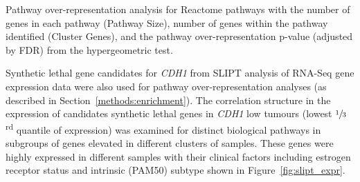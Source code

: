 \begin{table}[!hp]
{\begin{threeparttable}
\begin{tabular}{lccc}
  \hline
\end{tabular}
\begin{tablenotes}
\raggedright %
Pathway over-representation analysis for Reactome pathways with the number of genes in each pathway (Pathway Size), number of genes within the pathway identified (Cluster Genes), and the pathway over-representation p-value (adjusted by FDR) from the hypergeometric test.  
\end{tablenotes}
\end{threeparttable}
}
\end{table}

Synthetic lethal gene candidates for \textit{CDH1} from \gls{SLIPT} analysis of RNA-Seq gene expression data were also used for pathway over-representation analyses (as described in Section~\ref{methods:enrichment}). The correlation structure in the expression of candidates synthetic lethal genes in \textit{CDH1} low tumours (lowest $\sfrac{1}{3}$\textsuperscript{rd} quantile of expression) was examined for distinct biological pathways in subgroups of genes elevated in different clusters of samples. These genes were highly expressed in different samples with their clinical factors including estrogen receptor status and intrinsic (PAM50) subtype \citep{Parker2009} shown in Figure~\ref{fig:slipt_expr}.


